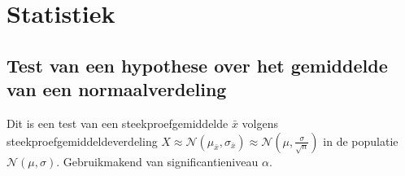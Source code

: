 \documentclass[a5paper]{article}
\begin{document}
\newpage
\section{Statistiek}
\subsection{Test van een hypothese over het gemiddelde van een normaalverdeling}

\begin{flushleft}
{Dit is een test van een steekproefgemiddelde $\bar{x}$ volgens steekproefgemiddeldeverdeling $X \approx \mathcal{N}({\mu _{\bar x}}, {\sigma _{\bar x}} ) \approx \mathcal{N}(\mu, \frac{\sigma}{\sqrt{n}}) $ in de populatie $\mathcal{N}(\mu, \sigma)$}. Gebruikmakend van significantieniveau $\alpha$.
\end{flushleft}
\end{document}
